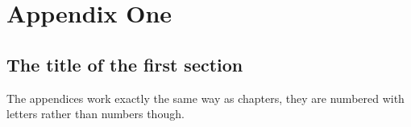 \chapter{Appendix One}
\section{The title of the first section}
The appendices work exactly the same way as chapters, they are numbered with letters rather than numbers though.
